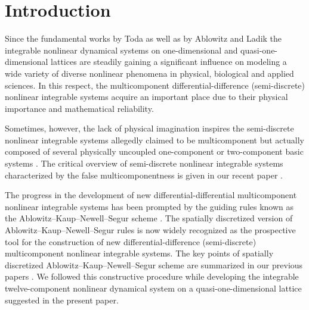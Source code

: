 \documentclass[pdftex]{sigma}
\numberwithin{equation}{section}
\begin{document}


\section{Introduction}

Since the fundamental works by Toda \cite{toda-JPSJ-22-431, toda-JPSJ-23-501, toda-PhR-18-1} as well as by Ablowitz and Ladik \mbox{\cite{ ablowitz-SAM-58-17,ablowitz-SAM-55-213, ablowitz-JMP-17-1011}} the integrable nonlinear dynamical systems on one-dimensional and quasi-one-dimensional lattices
are steadily gaining a significant influence on modeling a wide variety of diverse nonlinear phenomena in physical, biological and applied sciences. In this respect, the multicomponent differential-difference (semi-discrete) nonlinear integrable systems \cite{ablowitz-PLA-253-287, ablowitz-CSR-11-159,gerdzhikov-TMP-52-676, tsuchida-JMP-39-4785, tsuchida-JPA-32-2239, vakhnenko-JPA-32-5735, vakhnenko-PRE-60-R2492,vakhnenko-JNMP-24-250, vakhnenko-PRE-61-7110, vakhnenko-EPJP-137-1176} acquire an important place due to their physical importance and mathematical reliability.

Sometimes, however, the lack of physical imagination inspires the semi-discrete nonlinear integrable systems allegedly claimed to be multicomponent but actually composed of several physically uncoupled one-component or two-component basic systems \cite{babalic-RJP-63-114, babalic-IJMPB-34-2050274,babalic-JPA-50-415201,carstea-JPA-48-055205, wen-AML-123-107591,yu-WM-94-102500, yuan-CSF-168-113180}. The critical overview of semi-discrete nonlinear integrable systems characterized by the false multicomponentness is given in our recent paper \cite{vakhnenko-PLA-452-128460}.

The progress in the development of new differential-differential multicomponent nonlinear integrable systems has been prompted by the guiding rules known as the Ablowitz--Kaup--Newell--Segur scheme \cite{ablowitz-PRL-31-125, ablowitz-SAM-53-249}. The spatially discretized version of Ablowitz--Kaup--Newell--Segur rules is now widely recognized as the prospective tool for the construction of new differential-difference (semi-discrete) multicomponent nonlinear integrable systems. The key points of spatially discretized Ablowitz--Kaup--Newell--Segur scheme are summarized in our previous papers \cite{vakhnenko-UJP-69-168, vakhnenko-UJP-69-577}. We followed this constructive procedure while developing the integrable twelve-component nonlinear dynamical system on a quasi-one-dimensional lattice suggested in the present paper.
\end{document}
